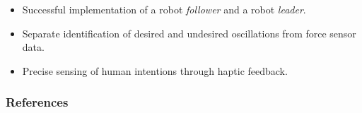 \documentclass[student,noshadow]{ITRslides}
\begin{document}
\begin{frame}
	\begin{itemize}
	\item Successful implementation of a robot \textit{follower} and a robot \textit{leader}.
	\item Separate identification of desired and undesired oscillations from force sensor data.
	\item Precise sensing of human intentions through haptic feedback.
	\end{itemize}
\end{frame}


\appendix
\begin{frame}
	\frametitle{References}
	\printbibliography
\end{frame}
\end{document}
